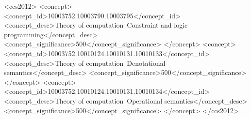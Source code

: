 \documentclass[sigplan,10pt,anonymous,review]{acmart}
\begin{document}
\begin{CCSXML}
<ccs2012>
<concept>
<concept_id>10003752.10003790.10003795</concept_id>
<concept_desc>Theory of computation~Constraint and logic programming</concept_desc>
<concept_significance>500</concept_significance>
</concept>
<concept>
<concept_id>10003752.10010124.10010131.10010133</concept_id>
<concept_desc>Theory of computation~Denotational semantics</concept_desc>
<concept_significance>500</concept_significance>
</concept>
<concept>
<concept_id>10003752.10010124.10010131.10010134</concept_id>
<concept_desc>Theory of computation~Operational semantics</concept_desc>
<concept_significance>500</concept_significance>
</concept>
</ccs2012>
\end{CCSXML}




\maketitle
\thispagestyle{empty}
















\end{document}

